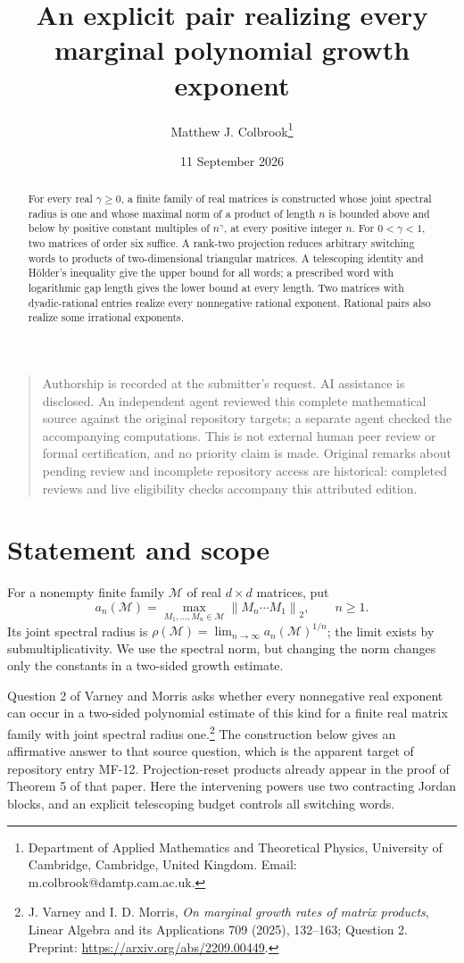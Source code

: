 \documentclass[11pt]{article}
\title{An explicit pair realizing every marginal polynomial growth exponent}
\author{Matthew J. Colbrook\thanks{Department of Applied Mathematics and Theoretical Physics, University of Cambridge, Cambridge, United Kingdom. Email: m.colbrook@damtp.cam.ac.uk.}}\date{11 September 2026}
\theoremstyle{remark}\newtheorem{remark}[theorem]{Remark}
\newcommand{\norm}[1]{\left\lVert #1\right\rVert_2}
\newcommand{\jsr}{\rho}
\begin{document}
\maketitle

\begin{quote}\small
Authorship is recorded at the submitter's request. AI assistance is disclosed. An independent agent reviewed this complete mathematical source against the original repository targets; a separate agent checked the accompanying computations. This is not external human peer review or formal certification, and no priority claim is made. Original remarks about pending review and incomplete repository access are historical: completed reviews and live eligibility checks accompany this attributed edition.
\end{quote}
\begin{abstract}
For every real $\gamma\geq0$, a finite family of real matrices is constructed whose joint spectral radius is one and whose maximal norm of a product of length $n$ is bounded above and below by positive constant multiples of $n^\gamma$, at every positive integer $n$. For $0<\gamma<1$, two matrices of order six suffice. A rank-two projection reduces arbitrary switching words to products of two-dimensional triangular matrices. A telescoping identity and H\"older's inequality give the upper bound for all words; a prescribed word with logarithmic gap length gives the lower bound at every length. Two matrices with dyadic-rational entries realize every nonnegative rational exponent. Rational pairs also realize some irrational exponents.
\end{abstract}

\section{Statement and scope}
For a nonempty finite family $\mathcal M$ of real $d\times d$ matrices, put
\[
 a_n(\mathcal M)=\max_{M_1,\ldots,M_n\in\mathcal M}
                 \norm{M_n\cdots M_1},\qquad n\geq1.
\]
Its joint spectral radius is $\jsr(\mathcal M)=\lim_{n\to\infty}a_n(\mathcal M)^{1/n}$; the limit exists by submultiplicativity. We use the spectral norm, but changing the norm changes only the constants in a two-sided growth estimate.

Question 2 of Varney and Morris asks whether every nonnegative real exponent can occur in a two-sided polynomial estimate of this kind for a finite real matrix family with joint spectral radius one.\footnote{J. Varney and I. D. Morris, \emph{On marginal growth rates of matrix products}, Linear Algebra and its Applications 709 (2025), 132--163; Question 2. Preprint: \url{https://arxiv.org/abs/2209.00449}.} The construction below gives an affirmative answer to that source question, which is the apparent target of repository entry MF-12. Projection-reset products already appear in the proof of Theorem 5 of that paper. Here the intervening powers use two contracting Jordan blocks, and an explicit telescoping budget controls all switching words.
\end{document}
